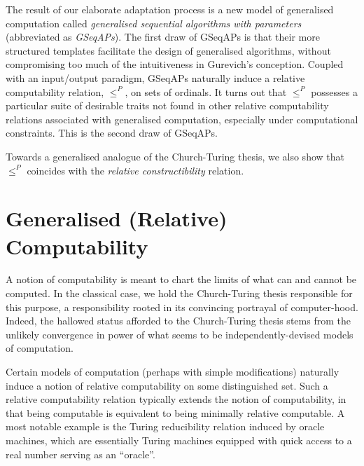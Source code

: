 \documentclass[12pt, twoside]{memoir}
\numberwithin{equation}{section}
\theoremstyle{definition}
\theoremstyle{remark}
\theoremstyle{definition}
\theoremstyle{definition}
\theoremstyle{definition}
\theoremstyle{remark}
\begin{document}
The result of our elaborate adaptation process is a new model of generalised computation called \textit{generalised sequential algorithms with parameters} (abbreviated as \textit{GSeqAPs}). The first draw of GSeqAPs is that their more structured templates facilitate the design of generalised algorithms, without compromising too much of the intuitiveness in Gurevich's conception. Coupled with an input/output paradigm, GSeqAPs naturally induce a relative computability relation, $\leq^P$, on sets of ordinals. It turns out that $\leq^P$ possesses a particular suite of desirable traits not found in other relative computability relations associated with generalised computation, especially under computational constraints. This is the second draw of GSeqAPs. 

Towards a generalised analogue of the Church-Turing thesis, we also show that $\leq^P$ coincides with the \textit{relative constructibility} relation.

\section{Generalised (Relative) Computability}\label{subsec22}

A notion of computability is meant to chart the limits of what can and cannot be computed. In the classical case, we hold the Church-Turing thesis responsible for this purpose, a responsibility rooted in its convincing portrayal of computer-hood. Indeed, the hallowed status afforded to the Church-Turing thesis stems from the unlikely convergence in power of what seems to be independently-devised models of computation.

Certain models of computation (perhaps with simple modifications) naturally induce a notion of relative computability on some distinguished set. Such a relative computability relation typically extends the notion of computability, in that being computable is equivalent to being minimally relative computable. A most notable example is the Turing reducibility relation induced by oracle machines, which are essentially Turing machines equipped with quick access to a real number serving as an ``oracle''. 
\end{document}

